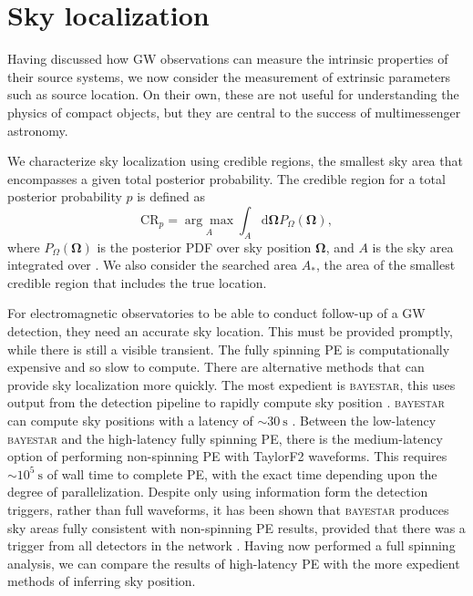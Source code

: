 \section{Sky localization}

Having discussed how GW observations can measure the intrinsic properties of their source systems, we now consider the measurement of extrinsic parameters such as source location. On their own, these are not useful for understanding the physics of compact objects, but they are central to the success of multimessenger astronomy.

We characterize sky localization using credible regions, the smallest sky area that encompasses a given total posterior probability. The credible region for a total posterior probability $p$ is defined as
\begin{equation}
\mathrm{CR}_p = \underset{A}{\arg\!\max} \int_A \mathrm{d}\boldsymbol{\Omega} P_{\Omega}(\boldsymbol{\Omega}),
\label{eq:CR}
\end{equation}
where $P_{\Omega}(\boldsymbol{\Omega})$ is the posterior PDF over sky position $\boldsymbol{\Omega}$, and $A$ is the sky area integrated over \citep{Sidery_2014}. We also consider the searched area $A_\ast$, the area of the smallest credible region that includes the true location.

For electromagnetic observatories to be able to conduct follow-up of a GW detection, they need an accurate sky location. This must be provided promptly, while there is still a visible transient. The fully spinning PE is computationally expensive and so slow to compute. There are alternative methods that can provide sky localization more quickly. The most expedient is \textsc{bayestar}, this uses output from the detection pipeline to rapidly compute sky position \citep{Singer_2014}. \textsc{bayestar} can compute sky positions with a latency of $\sim30~\mathrm{s}$ \citep{Berry_2014}. Between the low-latency \textsc{bayestar} and the high-latency fully spinning PE, there is the medium-latency option of performing non-spinning PE with TaylorF2 waveforms. This requires $\sim10^5~\mathrm{s}$ of wall time to complete PE, with the exact time depending upon the degree of parallelization. Despite only using information form the detection triggers, rather than full waveforms, it has been shown that \textsc{bayestar} produces sky areas fully consistent with non-spinning PE results, provided that there was a trigger from all detectors in the network \citep{Singer_2014,Berry_2014}. Having now performed a full spinning analysis, we can compare the results of high-latency PE with the more expedient methods of inferring sky position.

